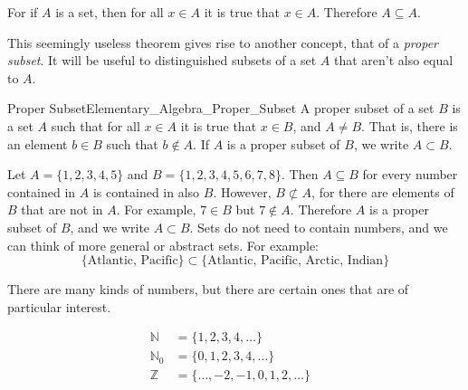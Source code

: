 \documentclass[crop=false,class=book,oneside]{standalone}
\begin{document}
            \begin{bproof}
                For if $A$ is a set, then for all
                $x\in{A}$ it is true that $x\in{A}$.
                Therefore $A\subseteq{A}$.
            \end{bproof}
            This seemingly useless theorem gives rise to another
            concept, that of a \textit{proper subset}. It will
            be useful to distinguished subsets of a set $A$
            that aren't also equal to $A$.
            \begin{fdefinition}{Proper Subset}{Elementary_Algebra_Proper_Subset}
                A proper subset of a set $B$ is a set $A$ such that for all
                $x\in{A}$ it is true that $x\in{B}$, and $A\ne{B}$. That is,
                there is an element $b\in{B}$ such that $b\notin{A}$. If $A$
                is a proper subset of $B$, we write $A\subset{B}$.
            \end{fdefinition}
            \begin{fexample}{}{}
                Let $A=\{1,2,3,4,5\}$ and $B=\{1,2,3,4,5,6,7,8\}$.
                Then $A\subseteq{B}$ for every number contained in $A$
                is contained in also $B$. However, $B\not\subset{A}$,
                for there are elements of $B$ that are not in $A$.
                For example, $7\in{B}$ but $7\notin{A}$. Therefore $A$ is a
                proper subset of $B$, and we write $A\subset{B}$. Sets
                do not need to contain numbers, and we can think of more
                general or abstract sets. For example:
                \begin{equation*}
                    \{\textrm{Atlantic, Pacific}\}\subset
                    \{\textrm{Atlantic, Pacific, Arctic, Indian}\}
                \end{equation*}
            \end{fexample}
            There are many kinds of numbers, but there are certain
            ones that are of particular interest.
            \newline
            \begin{minipage}[t]{0.44\textwidth}
                \centering
                \begin{align*}
                    \mathbb{N}&=\{1,2,3,4,\hdots\}
                    &\tag{Natural Numbers}\\
                    \mathbb{N}_{0}&=\{0,1,2,3,4,\hdots\}
                    &\tag{Whole Numbers}\\
                    \mathbb{Z}&=\{\hdots,-2,-1,0,1,2,\hdots\}
                    &\tag{Integers}
                \end{align*}
            \end{minipage}
\end{document}
